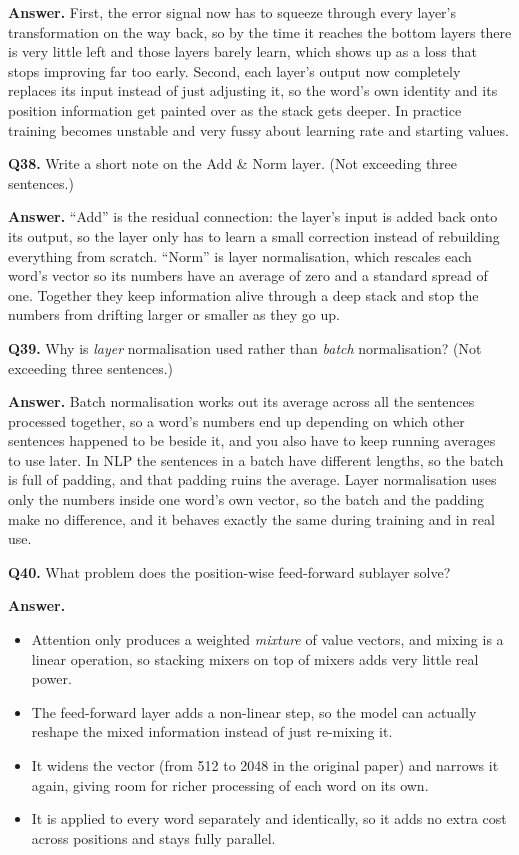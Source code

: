 \documentclass[11pt]{article}
\begin{document}
\textbf{Answer.} First, the error signal now has to squeeze through every layer's
transformation on the way back, so by the time it reaches the bottom layers there is very
little left and those layers barely learn, which shows up as a loss that stops improving far
too early. Second, each layer's output now completely replaces its input instead of just
adjusting it, so the word's own identity and its position information get painted over as the
stack gets deeper. In practice training becomes unstable and very fussy about learning rate
and starting values.

\medskip
\textbf{Q38.} Write a short note on the Add \& Norm layer. (Not exceeding three sentences.)

\textbf{Answer.} ``Add'' is the residual connection: the layer's input is added back onto its
output, so the layer only has to learn a small correction instead of rebuilding everything
from scratch. ``Norm'' is layer normalisation, which rescales each word's vector so its
numbers have an average of zero and a standard spread of one. Together they keep information
alive through a deep stack and stop the numbers from drifting larger or smaller as they go up.

\medskip
\textbf{Q39.} Why is \emph{layer} normalisation used rather than \emph{batch} normalisation?
(Not exceeding three sentences.)

\textbf{Answer.} Batch normalisation works out its average across all the sentences processed
together, so a word's numbers end up depending on which other sentences happened to be beside
it, and you also have to keep running averages to use later. In NLP the sentences in a batch
have different lengths, so the batch is full of padding, and that padding ruins the average.
Layer normalisation uses only the numbers inside one word's own vector, so the batch and the
padding make no difference, and it behaves exactly the same during training and in real use.

\medskip
\textbf{Q40.} What problem does the position-wise feed-forward sublayer solve?

\textbf{Answer.}
\begin{itemize}
  \item Attention only produces a weighted \emph{mixture} of value vectors, and mixing is a linear operation, so stacking mixers on top of mixers adds very little real power.
  \item The feed-forward layer adds a non-linear step, so the model can actually reshape the mixed information instead of just re-mixing it.
  \item It widens the vector (from 512 to 2048 in the original paper) and narrows it again, giving room for richer processing of each word on its own.
  \item It is applied to every word separately and identically, so it adds no extra cost across positions and stays fully parallel.
\end{itemize}
\end{document}
